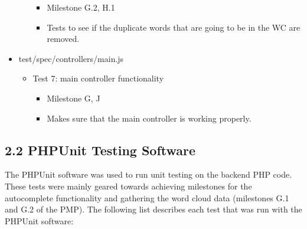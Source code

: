 \documentclass[]{article}
\begin{document}
\begin{itemize}
\begin{itemize}
    \begin{itemize}
    \itemsep1pt\parskip0pt
    \item
      Milestone G.2, H.1
    \item
      Tests to see if the duplicate words that are going to be in the WC
      are removed.
    \end{itemize}
  \end{itemize}
\item
  test/spec/controllers/main.js

  \begin{itemize}
  \itemsep1pt\parskip0pt
  \item
    Test 7: main controller functionality

    \begin{itemize}
    \itemsep1pt\parskip0pt
    \item
      Milestone G, J
    \item
      Makes sure that the main controller is working properly.
    \end{itemize}
  \end{itemize}
\end{itemize}

\subsection{\textbf{2.2 PHPUnit Testing
Software}}\label{phpunit-testing-software}

The PHPUnit software was used to run unit testing on the backend PHP
code. These tests were mainly geared towards achieving milestones for
the autocomplete functionality and gathering the word cloud data
(milestones G.1 and G.2 of the PMP). The following list describes each
test that was run with the PHPUnit software:
\end{document}
